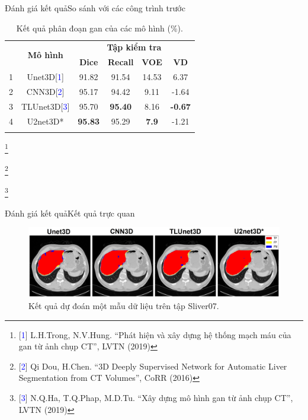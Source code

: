 \documentclass[
	10pt,                %
	aspectratio=169,     %
]{beamer}
\begin{document}
    \begin{frame}{Đánh giá kết quả}{So sánh với các công trình trước}
        \begin{table}[H]
        \centering
        \begin{tabular}{c c c c c c}
        \Xhline{3\arrayrulewidth}
        \multirow{2}{*}{\textbf{STT}} & \multirow{2}{*}{\textbf{Mô hình}} & \multicolumn{4}{c}{\textbf{Tập kiểm tra}} \\ \cline{3-6} 
        & &  \textbf{Dice} & \textbf{Recall} & \textbf{VOE} & \textbf{VD}\\ \hline
        1 & Unet3D\small[\textcolor{blue}{1}]   & 91.82   & 91.54     & 14.53  & 6.37  \\
        2 & CNN3D\small[\textcolor{blue}{2}]    & 95.17   & 94.42     & 9.11   & -1.64  \\
        3 & TLUnet3D\small[\textcolor{blue}{3}]        & 95.70   & \textbf{95.40}     & 8.16   & \textbf{-0.67}    \\
        4 & U2net3D* & \textbf{95.83}  & 95.29 & \textbf{7.9}  & -1.21 \\ 
        \Xhline{3\arrayrulewidth}
        \end{tabular}
        \caption{Kết quả phân đoạn gan của các mô hình (\%).}
        \end{table}
        
        \vspace{-8mm}\let\thefootnote\relax\footnote{\hspace{-6mm}\scriptsize [\textcolor{blue}{1}] L.H.Trong, N.V.Hung. “Phát hiện và xây dựng hệ thống mạch máu của gan từ ảnh chụp CT”, LVTN (2019)}
        
        \vspace{-8mm}\let\thefootnote\relax\footnote{\hspace{-6mm}\scriptsize [\textcolor{blue}{2}] Qi Dou, H.Chen. “3D Deeply Supervised Network for Automatic Liver Segmentation from CT Volumes”, CoRR (2016)}
        
        \vspace{-8mm}\let\thefootnote\relax\footnote{\hspace{-6mm}\scriptsize [\textcolor{blue}{3}] N.Q.Ha, T.Q.Phap, M.D.Tu. “Xây dựng mô hình gan từ ảnh chụp CT”, LVTN (2019)}
    \end{frame}
    
    \begin{frame}{Đánh giá kết quả}{Kết quả trực quan}
        \begin{figure}[H]
            \centering
            \includegraphics[width=\textwidth]{Presentation_template/figures/liver-result-legend.jpg}
            \caption{Kết quả dự đoán một mẫu dữ liệu trên tập Sliver07.}
        \end{figure}
    \end{frame}
    
\end{document}
